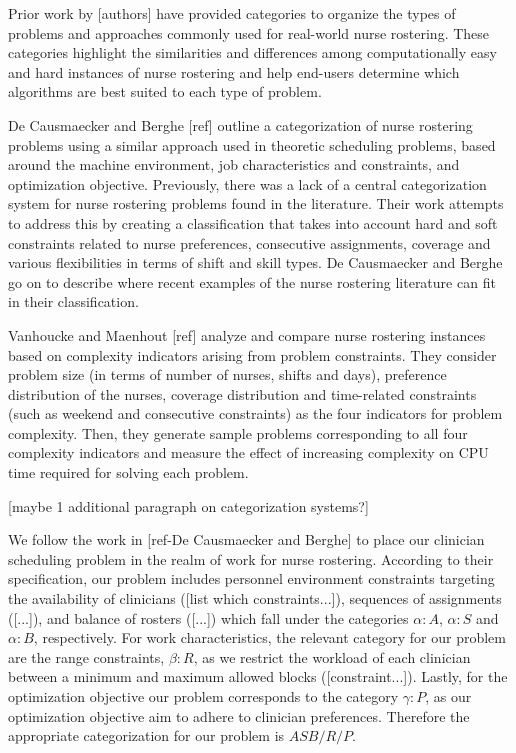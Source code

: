 Prior work by [authors] have   %
provided categories to organize the types of problems and approaches
commonly used for real-world nurse rostering.
These categories highlight the similarities  %
and differences
among computationally easy and hard instances of nurse rostering and 
help end-users determine
which algorithms
are best suited to each type of problem.

De Causmaecker and Berghe [ref] outline a categorization
of nurse rostering problems using a similar approach used in theoretic scheduling problems,
based around the machine environment, job characteristics and constraints,
and optimization objective. Previously, there was a lack of a central categorization system
for nurse rostering problems found in the literature. Their work attempts
to address this by creating a classification that takes into account
hard and soft constraints related to nurse preferences, consecutive 
assignments, coverage and various flexibilities in terms of shift and
skill types. De Causmaecker and Berghe go on to describe where recent examples of the nurse rostering
literature can fit in their classification. %

Vanhoucke and Maenhout [ref] analyze and compare nurse rostering instances
based on complexity indicators arising from problem constraints. They consider
problem size (in terms of number of nurses, shifts and days), preference distribution
of the nurses, coverage distribution and time-related constraints (such as weekend
and consecutive constraints) as the four indicators for problem complexity.
Then, they generate sample problems corresponding to all four complexity indicators
and measure the effect of increasing complexity on CPU time required for solving each
problem. 

[maybe 1 additional paragraph on categorization systems?]

We follow the work in [ref-De Causmaecker and Berghe] to place our clinician
scheduling problem in the realm of work for nurse rostering. 
According to their specification, our problem includes 
personnel environment constraints targeting the availability of clinicians
([list which constraints...]),
sequences of assignments ([...]), and balance of rosters ([...]) 
which fall under the categories $\alpha : A$, $\alpha : S$ and $\alpha : B$,
respectively. 
For work characteristics, the relevant category for our problem are the range
constraints, $\beta : R$, 
as we restrict the workload of each clinician between a minimum and maximum
allowed blocks ([constraint...]).
Lastly, for the optimization objective our problem corresponds to the category
$\gamma : P$, as our optimization objective
aim to adhere to clinician preferences. Therefore the appropriate categorization
for our problem is $ASB/R/P$.

